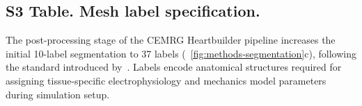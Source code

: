 %

\subsection*{S3 Table. Mesh label specification.}

The post-processing stage of the CEMRG Heartbuilder pipeline increases the
initial 10-label segmentation to 37 labels
(~\ref{fig:methods-segmentation}c), following the standard introduced
by~\cite{strocchi2020_cohort,strocchi2020_simulating}. Labels encode
anatomical structures required for assigning tissue-specific electrophysiology
and mechanics model parameters during simulation setup.

